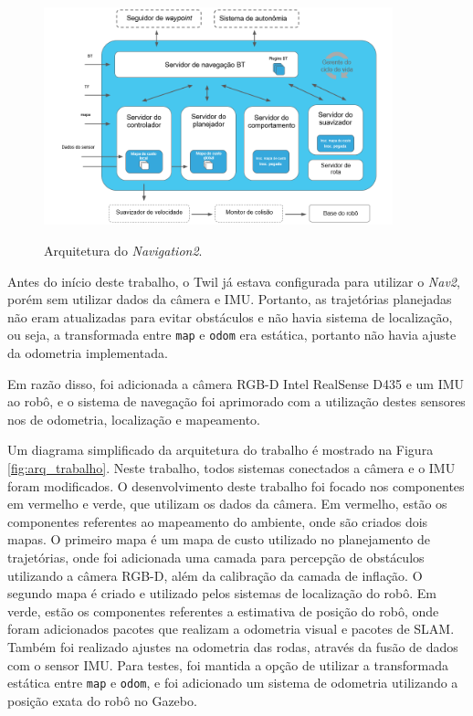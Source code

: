 \documentclass[repeatfields,xlists,xpacks,oneside,yearsonly]{ufrgscca}
\begin{document}
\begin{figure}[h]
    {
        \centering
        \caption{Arquitetura do \textit{Navigation2}.}
        \label{fig:nav2_arc}
        \includegraphics[width=0.9\textwidth]{nav2_architecture_trad.png}\\
    }
    {} %
\end{figure}

Antes do início deste trabalho, o Twil já estava configurada para utilizar o \textit{Nav2},
porém sem utilizar dados da câmera e IMU.
Portanto, as trajetórias planejadas não eram atualizadas
para evitar obstáculos e não havia sistema de localização, ou seja,
a transformada entre \texttt{map} e \texttt{odom} era estática, portanto
não havia ajuste da odometria implementada.

Em razão disso, foi adicionada a câmera RGB-D Intel RealSense D435 e um IMU ao robô,
e o sistema de navegação foi aprimorado com a utilização destes sensores nos
de odometria, localização e mapeamento.

Um diagrama simplificado da arquitetura do trabalho é mostrado na
Figura \ref{fig:arq_trabalho}.
Neste trabalho, todos sistemas conectados a câmera e o IMU foram modificados.
O desenvolvimento deste trabalho foi focado nos componentes em vermelho
e verde, que utilizam os dados da câmera.
Em vermelho, estão os componentes referentes ao mapeamento do ambiente,
onde são criados dois mapas.
O primeiro mapa é um mapa de custo utilizado no planejamento de trajetórias,
onde foi adicionada uma camada para percepção de obstáculos utilizando
a câmera RGB-D, além da calibração da camada de inflação.
O segundo mapa é criado e utilizado pelos sistemas de localização do robô.
Em verde, estão os componentes referentes a estimativa de
posição do robô, onde foram adicionados pacotes que realizam a
odometria visual e pacotes de SLAM.
Também foi realizado ajustes na odometria das rodas, através da fusão
de dados com o sensor IMU.
Para testes, foi mantida a opção de utilizar a transformada estática entre
\texttt{map} e \texttt{odom}, e foi adicionado um sistema de odometria
utilizando a posição exata do robô no Gazebo.
\end{document}
